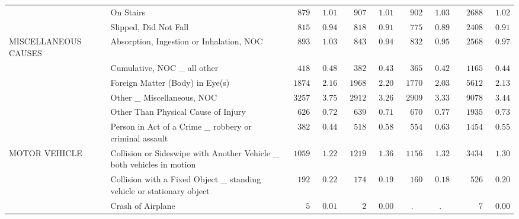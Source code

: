 \documentclass[9pt, oneside]{article}   	%
\begin{document}
\begin{longtable}{p{1.8in}p{2.2in}cccccccc}
 & On Stairs  & $\phantom{00}879$ & $\phantom{0}1.01$ & $\phantom{00}907$ & $\phantom{0}1.01$ & $\phantom{00}902$ & $\phantom{0}1.03$ & $\phantom{00}2688$ & $\phantom{0}1.02$ \\
 & Slipped, Did Not Fall  & $\phantom{00}815$ & $\phantom{0}0.94$ & $\phantom{00}818$ & $\phantom{0}0.91$ & $\phantom{00}775$ & $\phantom{0}0.89$ & $\phantom{00}2408$ & $\phantom{0}0.91$ \\
MISCELLANEOUS CAUSES & Absorption, Ingestion or Inhalation, NOC  & $\phantom{00}893$ & $\phantom{0}1.03$ & $\phantom{00}843$ & $\phantom{0}0.94$ & $\phantom{00}832$ & $\phantom{0}0.95$ & $\phantom{00}2568$ & $\phantom{0}0.97$ \\
 & Cumulative, NOC \_ all other  & $\phantom{00}418$ & $\phantom{0}0.48$ & $\phantom{00}382$ & $\phantom{0}0.43$ & $\phantom{00}365$ & $\phantom{0}0.42$ & $\phantom{00}1165$ & $\phantom{0}0.44$ \\
 & Foreign Matter (Body) in Eye(s)  & $\phantom{0}1874$ & $\phantom{0}2.16$ & $\phantom{0}1968$ & $\phantom{0}2.20$ & $\phantom{0}1770$ & $\phantom{0}2.03$ & $\phantom{00}5612$ & $\phantom{0}2.13$ \\
 & Other \_ Miscellaneous, NOC  & $\phantom{0}3257$ & $\phantom{0}3.75$ & $\phantom{0}2912$ & $\phantom{0}3.26$ & $\phantom{0}2909$ & $\phantom{0}3.33$ & $\phantom{00}9078$ & $\phantom{0}3.44$ \\
 & Other Than Physical Cause of Injury  & $\phantom{00}626$ & $\phantom{0}0.72$ & $\phantom{00}639$ & $\phantom{0}0.71$ & $\phantom{00}670$ & $\phantom{0}0.77$ & $\phantom{00}1935$ & $\phantom{0}0.73$ \\
 & Person in Act of a Crime \_ robbery or criminal assault  & $\phantom{00}382$ & $\phantom{0}0.44$ & $\phantom{00}518$ & $\phantom{0}0.58$ & $\phantom{00}554$ & $\phantom{0}0.63$ & $\phantom{00}1454$ & $\phantom{0}0.55$ \\
MOTOR VEHICLE & Collision or Sideswipe with Another Vehicle \_ both vehicles in motion  & $\phantom{0}1059$ & $\phantom{0}1.22$ & $\phantom{0}1219$ & $\phantom{0}1.36$ & $\phantom{0}1156$ & $\phantom{0}1.32$ & $\phantom{00}3434$ & $\phantom{0}1.30$ \\
 & Collision with a Fixed Object \_ standing vehicle or stationary object  & $\phantom{00}192$ & $\phantom{0}0.22$ & $\phantom{00}174$ & $\phantom{0}0.19$ & $\phantom{00}160$ & $\phantom{0}0.18$ & $\phantom{000}526$ & $\phantom{0}0.20$ \\
 & Crash of Airplane  & $\phantom{0000}5$ & $\phantom{0}0.01$ & $\phantom{0000}2$ & $\phantom{0}0.00$ & . & . & $\phantom{00000}7$ & $\phantom{0}0.00$ \\

\end{longtable}
\end{document}
